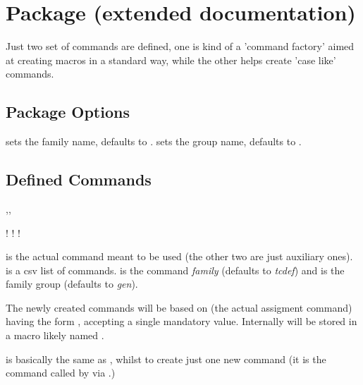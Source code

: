 \documentclass[dctools,english]{ufrgscca} %
\newif\iffulldoc
\begin{document}
\iffulldoc
\section{ Package (extended documentation)}
Just two set of commands are defined, one is kind of a 'command factory' aimed at creating macros in a standard way, while the other helps create 'case like' commands.


\subsection{Package Options}
\begin{Options}
	 sets the family name, defaults to .
	 sets the group name, defaults to .
\end{Options}

\subsection{Defined Commands}
\begin{Macros}{\cmdfactory,\factory,\tcgen@cdef}
	\begin{Syntax}%
		\Macro!{\cmdfactory}{}
		\Macro!{\factory}{}
		\Macro!{\tcgen@cdef}{}
	\end{Syntax}
	\Macro{\cmdfactory}{} is the actual command meant to be used (the other two are just auxiliary ones).  is a csv list of commands.  is the command \emph{family} (defaults to \emph{tcdef}) and  is the family group (defaults to \emph{gen}).

	The newly created commands will be based on \Macro{\tcgen@cdef}{} (the actual assigment command) having the form , accepting a single mandatory value. Internally  will be stored in a macro likely named \Macro{\fam@grp@cmd}{}.

    \Macro{\factory}{} is basically the same as \Macro{\cmdfactory}{}, whilst to create just one new command (it is the command called by \Macro{\cmdfactory}{} via \Macro{\forcsvlist}{}.)
\end{Macros}
\end{document}
